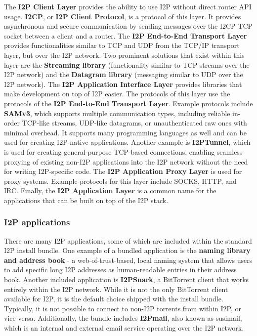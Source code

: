 The \textbf{I2P Client Layer} provides the ability to use I2P without direct router API usage. \textbf{I2CP}, or \textbf{I2P Client Protocol}, is a protocol of this layer. It provides asynchronous and secure communication by sending messages over the I2CP TCP socket between a client and a router. The \textbf{I2P End-to-End Transport Layer} provides functionalities similar to TCP and UDP from the TCP/IP transport layer, but over the I2P network. Two prominent solutions that exist within this layer are the \textbf{Streaming library} (functionality similar to TCP streams over the I2P network) and the \textbf{Datagram library} (messaging similar to UDP over the I2P network). The \textbf{I2P Application Interface Layer} provides libraries that make development on top of I2P easier. The protocols of this layer use the protocols of the \textbf{I2P End-to-End Transport Layer}. Example protocols include \textbf{SAMv3}, which supports multiple communication types, including reliable in-order TCP-like streams, UDP-like datagrams, or unauthenticated raw ones with minimal overhead. It supports many programming languages as well and can be used for creating I2P-native applications. Another example is \textbf{I2PTunnel}, which is used for creating general-purpose TCP-based connections, enabling seamless proxying of existing non-I2P applications into the I2P network without the need for writing I2P-specific code. The \textbf{I2P Application Proxy Layer} is used for proxy systems. Example protocols for this layer include SOCKS, HTTP, and IRC. Finally, the \textbf{I2P Application Layer} is a common name for the applications that can be built on top of the I2P stack.

\subsubsection{I2P applications}

There are many I2P applications, some of which are included within the standard I2P install bundle. One example of a bundled application is the \textbf{naming library and address book} - a web-of-trust-based, local naming system that allows users to add specific long I2P addresses as human-readable entries in their address book. Another included application is \textbf{I2PSnark}, a BitTorrent client that works entirely within the I2P network. While it is not the only BitTorrent client available for I2P, it is the default choice shipped with the install bundle. Typically, it is not possible to connect to non-I2P torrents from within I2P, or vice versa. Additionally, the bundle includes \textbf{I2Pmail}, also known as susimail, which is an internal and external email service operating over the I2P network.


